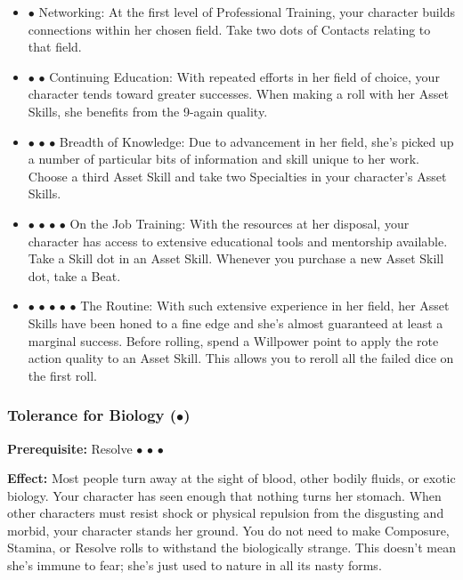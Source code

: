 \documentclass["../Misguided by Starlight.tex"]{subfiles}
\begin{document}
			\begin{itemize}
				\item $\bullet$ Networking: At the first level of Professional Training, your character builds connections within her chosen field. Take two dots of Contacts relating to that field.
				
				\item $\bullet$ $\bullet$ Continuing Education: With repeated efforts in her field of choice, your character tends toward greater successes. When making a roll with her Asset Skills, she benefits from the 9-again quality.
				
				\item $\bullet$ $\bullet$ $\bullet$ Breadth of Knowledge: Due to advancement in her field, she’s picked up a number of particular bits of information and skill unique to her work. Choose a third Asset Skill and take two Specialties in your character’s Asset Skills.
				
				\item $\bullet$ $\bullet$ $\bullet$ $\bullet$ On the Job Training: With the resources at her disposal, your character has access to extensive educational tools and mentorship available. Take a Skill dot in an Asset Skill. Whenever you purchase a new Asset Skill dot, take a Beat.
				
				\item $\bullet$ $\bullet$ $\bullet$ $\bullet$ $\bullet$ The Routine: With such extensive experience in her field, her Asset Skills have been honed to a fine edge and she’s almost guaranteed at least a marginal success. Before rolling, spend a Willpower point to apply the rote action quality to an Asset Skill. This allows you to reroll all the failed dice on the first roll.
			\end{itemize}
			
	
	\subsubsection{Tolerance for Biology ($\bullet$)} %
		\textbf{Prerequisite:} Resolve $\bullet$ $\bullet$ $\bullet$
		
		\textbf{Effect:} Most people turn away at the sight of blood, other bodily fluids, or exotic biology. Your character has seen enough that nothing turns her stomach. When other characters must resist shock or physical repulsion from the disgusting and morbid, your character stands her ground. You do not need to make Composure, Stamina, or Resolve rolls to withstand the biologically strange. This doesn’t mean she’s immune to fear; she’s just used to nature in all its nasty forms.
	
\end{document}
